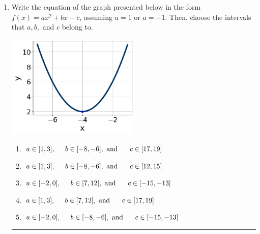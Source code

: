 \documentclass[14pt]{extbook}
\newcommand{\litem}[1]{\item#1\hspace*{-1cm}\rule{\textwidth}{0.4pt}}
\begin{document}
\begin{enumerate}
{\begin{enumerate}[label=\Alph*.]
\end{enumerate} }
\litem{
Write the equation of the graph presented below in the form $f(x)=ax^2+bx+c$, assuming  $a=1$ or $a=-1$. Then, choose the intervals that $a, b,$ and $c$ belong to.
\begin{center}
    \includegraphics[width=0.5\textwidth]{../Figures/quadraticGraphToEquationA.png}
\end{center}
\begin{enumerate}[label=\Alph*.]
\item \( a \in [1, 3], \hspace*{5mm} b \in [-8, -6], \text{ and } \hspace*{5mm} c \in [17, 19] \)
\item \( a \in [1, 3], \hspace*{5mm} b \in [-8, -6], \text{ and } \hspace*{5mm} c \in [12, 15] \)
\item \( a \in [-2, 0], \hspace*{5mm} b \in [7, 12], \text{ and } \hspace*{5mm} c \in [-15, -13] \)
\item \( a \in [1, 3], \hspace*{5mm} b \in [7, 12], \text{ and } \hspace*{5mm} c \in [17, 19] \)
\item \( a \in [-2, 0], \hspace*{5mm} b \in [-8, -6], \text{ and } \hspace*{5mm} c \in [-15, -13] \)


\end{enumerate}}
\end{enumerate}
\end{document}
